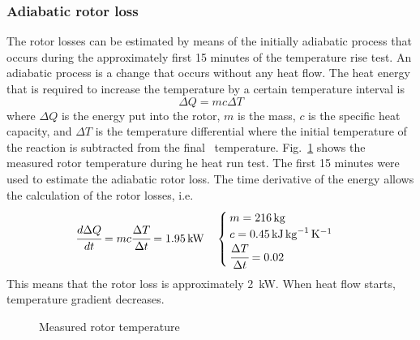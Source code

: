 \subsubsection{Adiabatic rotor loss}
The rotor losses can be estimated by means of the initially adiabatic process that occurs during the approximately first 15 minutes of the temperature rise test. An adiabatic process is a change that occurs without any heat flow. The heat energy that is required to increase the temperature by a certain temperature interval is
\begin{equation}
 \Delta Q = m c \Delta T
\end{equation}
where $\Delta Q$ is the energy put into the rotor, $m$ is the mass, $c$ is the specific heat capacity, and $\Delta T$ is the temperature differential where the initial temperature of the reaction is subtracted from the final~%
temperature. Fig.~\ref{fig:measured_rot_temp} shows the measured rotor temperature during he heat run test. The first 15 minutes were used to estimate the adiabatic rotor loss. The time derivative of the energy allows the calculation of the rotor losses, i.e.
\begin{equation}
 \label{eqn:adibatic}
 \cfrac{d\Delta Q}{dt} = m c \cfrac{\Delta T}{\Delta t}=\SI{1.95}{kW}
 \quad
 \begin{cases}
 m = \SI{216}{kg} \\
 c = \SI{0.45}{kJ.kg^{-1}.K^{-1}} \\
 \cfrac{\Delta T}{\Delta t} = 0.02
 \end{cases}
\end{equation}
This means that the rotor loss is approximately \SI{2}{kW}. When heat flow starts, temperature gradient decreases.
\begin{figure}[htbp]
  \centering
    
  \caption{Measured rotor temperature}
  \label{fig:measured_rot_temp}
\end{figure}

